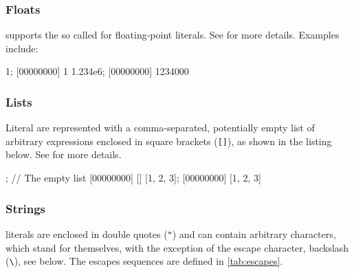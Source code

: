 \subsubsection{Floats}
\label{sec:us-syn-lit-float}

\us supports the so called  for
floating-point literals.  See  for more details.
Examples include:

\begin{urbiscript}[firstnumber=last]
1;
[00000000] 1
1.234e6;
[00000000] 1234000
\end{urbiscript}

\subsubsection{Lists}
\label{sec:us-syn-lit-list}

Literal  are represented with a comma-separated, potentially
empty list of arbitrary expressions enclosed in square brackets
(\lstinline|[]|), as shown in the listing below.  See
 for more details.

\begin{urbiscript}[firstnumber=last]
[]; // The empty list
[00000000] []
[1, 2, 3];
[00000000] [1, 2, 3]
\end{urbiscript}

\subsubsection{Strings}
\label{sec:us-syn-lit-string}

 literals are enclosed in double quotes (\lstinline|"|)
and can contain arbitrary characters, which stand for themselves, with
the exception of the escape character, backslash (\lstinline|\|), see
below.  The escapes sequences are defined in \autoref{tab:escapes}.

